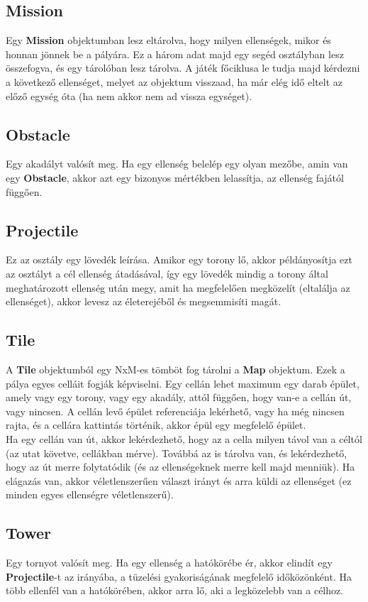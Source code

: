 \subsection{Mission}
Egy \textbf{Mission} objektumban lesz eltárolva, hogy milyen ellenségek, mikor és honnan jönnek be a pályára. Ez a három adat majd egy segéd osztályban lesz összefogva, és egy tárolóban lesz tárolva. A játék főciklusa le tudja majd kérdezni a következő ellenséget, melyet az objektum visszaad, ha már elég idő eltelt az előző egység óta (ha nem akkor nem ad vissza egységet).

\subsection{Obstacle}
Egy akadályt valósít meg. Ha egy ellenség belelép egy olyan mezőbe, amin van egy \textbf{Obstacle}, akkor azt egy bizonyos mértékben lelassítja, az ellenség fajától függően.

\subsection{Projectile}
Ez az osztály egy lövedék leírása. Amikor egy torony lő, akkor példányosítja ezt az osztályt a cél ellenség átadásával, így egy lövedék mindig a torony által meghatározott ellenség után megy, amit ha megfelelően megközelít (eltalálja az ellenséget), akkor levesz az életerejéből és megsemmisíti magát.

\subsection{Tile}
A \textbf{Tile} objektumból egy NxM-es tömböt fog tárolni a \textbf{Map} objektum. Ezek a pálya egyes celláit fogják képviselni. Egy cellán lehet maximum egy darab épület, amely vagy egy torony, vagy egy akadály, attól függően, hogy van-e a cellán út, vagy nincsen. A cellán levő épület referenciája lekérhető, vagy ha még nincsen rajta, és a cellára kattintás történik, akkor épül egy megfelelő épület.\\
Ha egy cellán van út, akkor lekérdezhető, hogy az a cella milyen távol van a céltól (az utat követve, cellákban mérve). Továbbá az is tárolva van, és lekérdezhető, hogy az út merre folytatódik (és az ellenségeknek merre kell majd menniük). Ha elágazás van, akkor véletlenszerűen választ irányt és arra küldi az ellenséget (ez minden egyes ellenségre véletlenszerű).

\subsection{Tower}
Egy tornyot valósít meg. Ha egy ellenség a hatókörébe ér, akkor elindít egy \textbf{Projectile}-t az irányába, a tüzelési gyakoriságának megfelelő időközönként. Ha több ellenfél van a hatókörében, akkor arra lő, aki a legközelebb van a célhoz.


